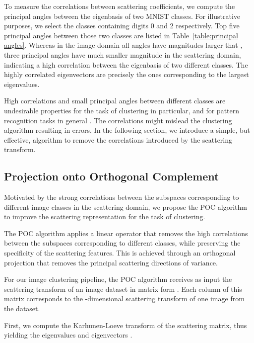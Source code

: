 \documentclass[11pt]{article}
\theoremstyle{definition}
\newcommand{\Table}[1]{Table~\ref{#1}}
\begin{document}
To measure the correlations between scattering coefficients, we compute the principal angles between the eigenbasis of two MNIST classes. For illustrative purposes, we select the classes containing digits 0 and 2 respectively.
Top five principal angles between those two classes are listed in \Table{table:principal angles}.
Whereas in the image domain all angles have magnitudes larger that , three principal angles have much smaller magnitude in the scattering domain, indicating a high correlation between the eigenbasis of two different classes. The highly correlated eigenvectors are precisely the ones corresponding to the largest eigenvalues.

High correlations and small principal angles between different classes are undesirable properties for the task of clustering in particular, and for pattern recognition tasks in general \cite{Huang_RoleOfPrincipalAngelsSubspaceClassification_2015}. The correlations might mislead the clustering algorithm resulting in errors. In the following section, we introduce a simple, but effective, algorithm to remove the correlations introduced by the scattering transform. 



\subsection{Projection onto Orthogonal Complement}\label{sec:Projection onto Orthogonal Complement}

Motivated by the strong correlations between the subspaces corresponding to different image classes in the scattering domain, we propose the POC algorithm to improve the scattering representation for the task of clustering.

The POC algorithm applies a linear operator that removes the high correlations between the subspaces corresponding to  different classes, while preserving the specificity of the scattering features. This is achieved through an orthogonal projection that removes the principal scattering directions of variance.

For our image clustering pipeline, the POC algorithm receives as input the scattering transform of an image dataset in matrix form . Each column of this matrix corresponds to the -dimensional scattering transform of one image from the dataset.

First, we compute the Karhunen-Loeve transform of the scattering matrix, thus yielding the eigenvalues  and eigenvectors . 
\end{document}
